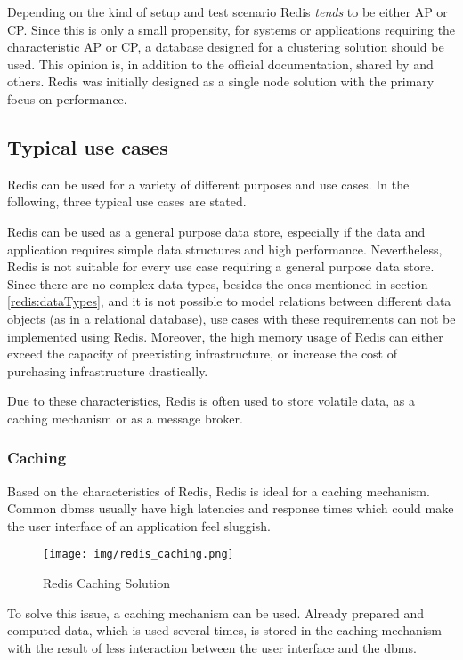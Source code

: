 Depending on the kind of setup and test scenario Redis \textit{tends} to be
either AP or CP. Since this is only a small propensity, for systems or applications
requiring the characteristic AP or CP, a database designed for a clustering
solution should be used. This opinion is, in addition to the official documentation,
shared by \cite{redis:davis2015} and others.
Redis was initially designed as a single node solution with the primary focus on
performance.

\subsection{Typical use cases}
Redis can be used for a variety of different purposes and use cases. In the
following, three typical use cases are stated.

Redis can be used as a general purpose data store, especially if the data and
application requires simple data structures and high performance.  Nevertheless,
Redis is not suitable for every use case requiring a general purpose data store.
Since there are no complex data types, besides the ones mentioned in section
\ref{redis:dataTypes}, and it is not possible to model relations between
different data objects (as in a relational database), use cases with these
requirements can not be implemented using Redis. Moreover, the high memory usage
of Redis can either exceed the capacity of preexisting infrastructure, or
increase the cost of purchasing infrastructure drastically.

Due to these characteristics, Redis is often used to store volatile data, as a
caching mechanism or as a message broker. \parencite{redis:commands, redis:introduction}

\subsubsection{Caching}
Based on the characteristics of Redis, Redis is ideal for a caching mechanism.
Common \glspl{dbms} usually have high latencies and response times which could
make the user interface of an application feel sluggish.

\begin{figure}[ht]
\texttt{[image: img/redis\_caching.png]}
\centering
\caption{Redis Caching Solution \parencite{redis:img:1}}
\label{fig:redisCaching}
\end{figure}

To solve this issue, a caching mechanism can be used. Already prepared and
computed data, which is used several times, is stored in the caching mechanism
with the result of less interaction between the user interface and the
\gls{dbms}.

